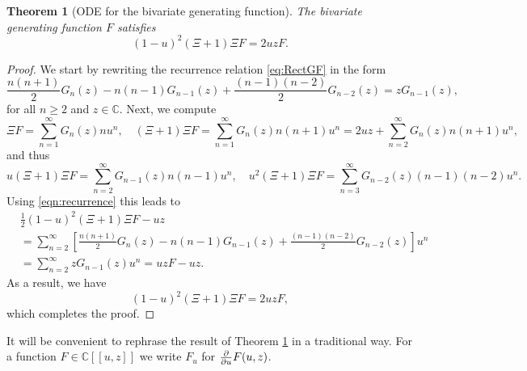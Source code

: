 \documentclass[11pt,a4paper]{article}
\numberwithin{equation}{section}
\newtheorem {theorem}{Theorem}[section]
\def\CC{\mathbb{C}}
\begin{document}
\begin{theorem}[ODE for the bivariate generating function]\label{thm:ODEtheta}
The bivariate generating function $F$ satisfies 
    \begin{equation*}
    (1-u)^2 (\Xi+1)\Xi F = 2uz F.
\end{equation*}
\end{theorem}
\begin{proof}
We start by rewriting the recurrence relation \eqref{eq:RectGF} in the form
\begin{equation}\label{eqn:recurrence}
    \frac{n(n+1)}{2} G_n(z) - n(n-1) G_{n-1}(z)  + \frac{(n-1)(n-2)}{2} G_{n-2}(z) = z G_{n-1}(z),
\end{equation}
for all $n\geq 2$ and $z\in\CC$. Next, we compute
\begin{equation*}
    \Xi F = \sum_{n=1}^\infty G_n(z) n u^n, \quad
    (\Xi+1)\Xi F = \sum_{n=1}^\infty G_n(z) n(n+1) u^n = 2uz + \sum_{n=2}^\infty G_n(z) n(n+1) u^n,
\end{equation*}
and thus
\begin{equation*}
    u(\Xi+1)\Xi F = \sum_{n=2}^\infty G_{n-1}(z) n(n-1) u^n,\quad 
    u^2 (\Xi+1)\Xi F = \sum_{n=3}^\infty G_{n-2}(z) (n-1)(n-2) u^n.
\end{equation*}
Using \eqref{eqn:recurrence} this leads to
\begin{align*}
    &\frac{1}{2} (1-u)^2 (\Xi+1)\Xi F - uz \\
    & = \sum_{n=2}^\infty \left[\frac{n(n+1)}{2} G_n(z) - n(n-1) G_{n-1}(z) + \frac{(n-1)(n-2)}{2} G_{n-2}(z)\right] u^n\\
    & = \sum_{n=2}^\infty z G_{n-1}(z) u^n = uz F- uz.
\end{align*}
As a result, we have
\begin{equation*}
    (1-u)^2 (\Xi+1)\Xi F = 2uz F,
\end{equation*} 
which completes the proof.
\end{proof}

It will be convenient to rephrase the result of Theorem \ref{thm:ODEtheta} in a traditional way. For a function $F\in\CC[[u,z]]$ we write $F_u$ for ${\partial\over\partial u}F(u,z)$.
\end{document}
